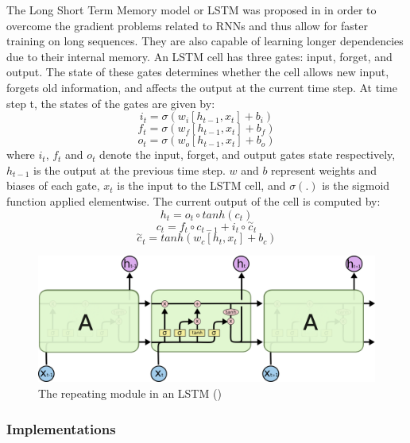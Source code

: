 The Long Short Term Memory model or LSTM was proposed in  in order to overcome the gradient problems related to RNNs and thus allow for faster training on long sequences.
They are also capable of learning longer dependencies due to their internal memory. An LSTM cell has three gates: input, forget, and output.
The state of these gates determines whether the cell allows new input, forgets old information, and affects the output at the current time step.
At time step t, the states of the gates are given by:
\begin{equation}
    i_t=\sigma(w_i[h_{t-1},x_t]+b_i)
\end{equation}
\begin{equation}
    f_t=\sigma(w_f[h_{t-1},x_t]+b_f)
\end{equation}
\begin{equation}
    o_t=\sigma(w_o[h_{t-1},x_t]+b_o)
\end{equation}
where $i_t$, $f_t$ and $o_t$ denote the input, forget, and output gates state respectively, $h_{t-1}$ is the output at the previous time step.
$w$ and $b$ represent weights and biases of each gate, $x_t$ is the input to the LSTM cell, and $\sigma (.)$ is the sigmoid function applied elementwise.
The current output of the cell is computed by:
\begin{equation}
    h_t=o_t \circ tanh(c_t)
\end{equation}
\begin{equation}
    c_t = f_t \circ c_{t-1}+i_t \circ \overset{\sim}{c}_t
\end{equation}
\begin{equation}
    \overset{\sim}{c}_t = tanh(w_c[h_t,x_t]+b_c)
\end{equation}

\begin{figure}
    \centering
    \includegraphics[width=0.8\columnwidth]{Figures/LSTM}
    \decoRule
    \caption{The repeating module in an LSTM (\cite{oinkina})}
    \label{fig:LSTM}
\end{figure}

\subsubsection{Implementations}

